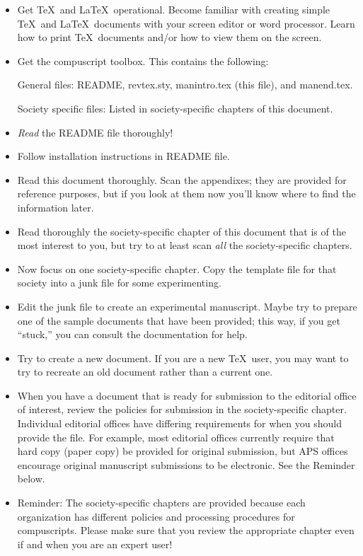 \begin{itemize}
\item Get \TeX\ and \LaTeX\ operational. Become familiar with creating
simple \TeX\ and \LaTeX\ documents with your screen editor or word
processor.  Learn how to print \TeX\ documents and/or how to view them on
the screen.

\item Get the compuscript toolbox.  This contains the following:

  General files: README, revtex.sty, manintro.tex (this file), and manend.tex.

  Society specific files: Listed in society-specific chapters of this
  document.

\item {\it Read\/} the README file thoroughly!

\item Follow installation instructions in README file.

\item Read this document thoroughly. Scan the appendixes; they are provided
for reference purposes, but if you look at them now you'll know where to
find the information later.


\item Read thoroughly the society-specific chapter of this document that
is of the most interest to you,  but try to at least scan {\it all\/} the
society-specific  chapters.

\item Now focus on one society-specific chapter. Copy the template file for
that society into a junk file for some experimenting.

\item Edit the junk file to create an experimental manuscript. Maybe try to
prepare one of the sample documents that have been provided; this way, if
you get ``stuck,'' you can consult the documentation for help.

\item  Try to create a new document.  If you are a new \TeX\ user, you may
want to try to recreate an old document rather than a current one.

\item When you have a document that is ready for submission to the
editorial office of interest, review the policies for submission in the
society-specific chapter.   Individual editorial offices have differing
requirements for when you should provide the \REVTeX{} file.  For example,
most editorial offices currently require  that hard copy (paper copy) be
provided for original submission, but APS offices encourage original
manuscript submissions to be electronic. See the Reminder below.

\item Reminder:  The society-specific chapters are provided because each
organization has different policies and processing procedures for
compuscripts. Please make sure that you review the appropriate chapter even
if and when you are an expert \REVTeX{} user!
\end{itemize}
